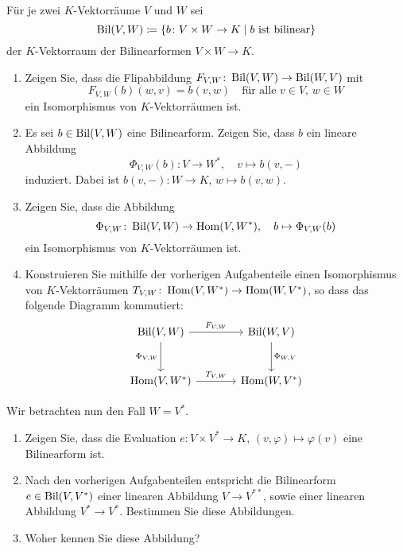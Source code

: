 \begin{question}[subtitle = Symbolmanipulation und kanonische Abbildungen]{4}
  Für je zwei $K$-Vektorräume $V$ und $W$ sei
  \[
              \operatorname{Bil}(V, W)
    \coloneqq \{b \colon V \times  W \to K \mid \text{$b$ ist bilinear}\}
  \]
  der $K$-Vektorraum der Bilinearformen $V \times W \to K$.
  \begin{enumerate}[leftmargin=*]
    \item
      Zeigen Sie, dass die Flipabbildung $F_{V,W} \colon \operatorname{Bil}(V, W) \to \operatorname{Bil}(W, V)$ mit
      \[
        F_{V,W}(b)(w,v) = b(v,w)
        \quad
        \text{für alle $v \in V$, $w \in W$}
      \]
      ein Isomorphismus von $K$-Vektorräumen ist.
    \item
      Es sei $b \in \operatorname{Bil}(V, W)$ eine Bilinearform.
      Zeigen Sie, dass $b$ ein lineare Abbildung
      \[
        \Phi_{V,W}(b) \colon V \to W^*,
        \quad
        v \mapsto b(v, -)
      \]
      induziert.
      Dabei ist $b(v, -) \colon W \to K$, $w \mapsto b(v,w)$.
  \item
      Zeigen Sie, dass die Abbildung
      \[
        \Phi_{V,W} \colon \operatorname{Bil}(V, W) \to \operatorname{Hom}(V, W^*),
        \quad
        b \mapsto \Phi_{V,W}(b)
      \]
      ein Isomorphismus von $K$-Vektorräumen ist.
    \item
      Konstruieren Sie mithilfe der vorherigen Aufgabenteile einen Isomorphismus von $K$-Vektorräumen $T_{V,W} \colon \operatorname{Hom}(V, W^*) \to \operatorname{Hom}(W, V^*)$, so dass das folgende Diagramm kommutiert:
      \[
        \begin{tikzcd}[row sep = large, column sep = large, ampersand replacement = \&]
                \Bil(V, W)    \arrow{r}{F_{V,W}}
                              \arrow[swap]{d}{\Phi_{V,W}}
            \&  \Bil(W, V)    \arrow{d}{\Phi_{W,V}}
          \\
                \Hom(V, W^*)  \arrow{r}{T_{V,W}}
            \&  \Hom(W, V^*)
        \end{tikzcd}
      \]
  \end{enumerate}
  Wir betrachten nun den Fall $W = V^*$.
  \begin{enumerate}[resume, leftmargin=*]
    \item
      Zeigen Sie, dass die Evaluation $e \colon V \times V^* \to K$, $(v, \varphi) \mapsto \varphi(v)$ eine Bilinearform ist.
   \item
      Nach den vorherigen Aufgabenteilen entspricht die Bilinearform $e \in \operatorname{Bil}(V, V^*)$ einer linearen Abbildung $V \to V^{**}$, sowie einer linearen Abbildung $V^* \to V^*$.
      Bestimmen Sie diese Abbildungen.
    \item
      Woher kennen Sie diese Abbildung?
  \end{enumerate}
\end{question}